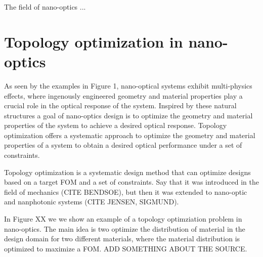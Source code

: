 



The field of nano-optics ...

\section{Topology optimization in nano-optics}

As seen by the examples in Figure 1, nano-optical systems exhibit multi-physics effects,
where ingenously engineered geometry and material properties play a crucial role in the
optical response of the system. Inspired by these natural structures a goal of nano-optics
design is to optimize the geometry and material properties of the system to achieve a desired
optical response. Topology optimization offers a systematic approach to optimize the geometry
and material properties of a system to obtain a desired optical performance under a set of constraints.

Topology optimization is a systematic design method that can optimize designs based on a target FOM and a set of constraints. 
Say that it was introduced in the field of mechanics (CITE BENDSOE), but then it was extended to 
nano-optic and nanphotonic systems (CITE JENSEN, SIGMUND).

In Figure XX we we show an example of a topology optimziation problem in nano-optics. The 
main idea is two optimize the distribution of material in the design domain for two different materials, 
where the material distribution is optimized to maximize a FOM. ADD SOMETHING ABOUT THE SOURCE.



